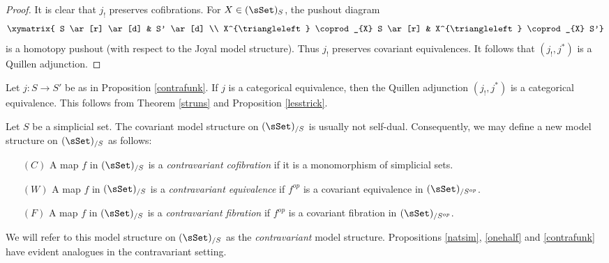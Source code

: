 \begin{proof}
It is clear that $j_{!}$ preserves cofibrations. For $X \in (\sSet)_{S}$, the pushout diagram
$$ \xymatrix{ S \ar[r] \ar[d] & S' \ar[d] \\
X^{\triangleleft} \coprod_{X} S \ar[r] & X^{\triangleleft} \coprod_{X} S'}$$
is a homotopy pushout (with respect to the Joyal model structure). Thus $j_{!}$ preserves covariant equivalences. It follows that $(j_{!}, j^{\ast})$ is a Quillen adjunction.
\end{proof}

\begin{remark}
Let $j: S \rightarrow S'$ be as in Proposition \ref{contrafunk}. If $j$ is a categorical
equivalence, then the Quillen adjunction $(j_{!}, j^{\ast})$ is a categorical
equivalence. This follows from Theorem \ref{struns} and Proposition \ref{lesstrick}.
\end{remark}

\begin{remark}
Let $S$ be a simplicial set. The covariant model structure on $(\sSet)_{/S}$
is usually not self-dual. Consequently, we may define a new model
structure on $(\sSet)_{/S}$ as follows:
\begin{itemize}
\item[$(C)$] A map $f$ in $(\sSet)_{/S}$ is a {\it contravariant cofibration} if
it is a monomorphism of simplicial sets.
\item[$(W)$] A map $f$ in $(\sSet)_{/S}$ is a {\it contravariant equivalence} if
$f^{op}$ is a covariant equivalence in $(\sSet)_{/S^{op}}$. 
\item[$(F)$] A map $f$ in $(\sSet)_{/S}$ is a {\it contravariant fibration} if
$f^{op}$ is a covariant fibration in $(\sSet)_{/S^{op}}$.
\end{itemize}
We will refer to this model structure on $(\sSet)_{/S}$ as the {\it contravariant} model structure. Propositions \ref{natsim}, \ref{onehalf} and \ref{contrafunk} have evident analogues in the contravariant setting.
\end{remark}

